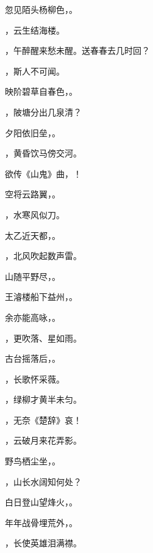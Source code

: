 \documentclass[12pt, a4paper, addpoints]{exam}
\begin{document}
\begin{questions}
\question[1] 忽见陌头杨柳色，\uline{\qquad\qquad\qquad}。

\question[1] \uline{\qquad\qquad\qquad}，云生结海楼。

\question[1] \uline{\qquad\qquad\qquad}，午醉醒来愁未醒。送春春去几时回？

\question[1] \uline{\qquad\qquad\qquad}，斯人不可闻。

\question[1] 映阶碧草自春色，\uline{\qquad\qquad\qquad}。

\question[1] \uline{\qquad\qquad\qquad}，陂塘分出几泉清？

\question[1] 夕阳依旧垒，\uline{\qquad\qquad\qquad}。

\question[1] \uline{\qquad\qquad\qquad}，黄昏饮马傍交河。

\question[1] 欲传《山鬼》曲，\uline{\qquad\qquad\qquad}！

\question[1] 空将云路翼，\uline{\qquad\qquad\qquad}。

\question[1] \uline{\qquad\qquad\qquad}，水寒风似刀。

\question[1] 太乙近天都，\uline{\qquad\qquad\qquad}。

\question[1] \uline{\qquad\qquad\qquad}，北风吹起数声雷。

\question[1] 山随平野尽，\uline{\qquad\qquad\qquad}。

\question[1] 王濬楼船下益州，\uline{\qquad\qquad\qquad}。

\question[1] 余亦能高咏，\uline{\qquad\qquad\qquad}。

\question[1] \uline{\qquad\qquad\qquad}，更吹落、星如雨。

\question[1] 古台摇落后，\uline{\qquad\qquad\qquad}。

\question[1] \uline{\qquad\qquad\qquad}，长歌怀采薇。

\question[1] \uline{\qquad\qquad\qquad}，绿柳才黄半未匀。

\question[1] \uline{\qquad\qquad\qquad}，无奈《楚辞》哀！

\question[1] \uline{\qquad\qquad\qquad}，云破月来花弄影。

\question[1] 野鸟栖尘坐，\uline{\qquad\qquad\qquad}。

\question[1] \uline{\qquad\qquad\qquad}，山长水阔知何处？

\question[1] 白日登山望烽火，\uline{\qquad\qquad\qquad}。

\question[1] 年年战骨埋荒外，\uline{\qquad\qquad\qquad}。

\question[1] \uline{\qquad\qquad\qquad}，长使英雄泪满襟。


\end{questions}
\end{document}

